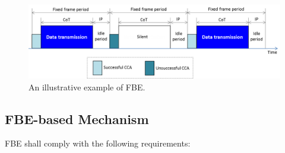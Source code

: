 \begin{figure}[!t]
	\centering
	\includegraphics[width=0.9\columnwidth]{figs/FBE-example}
	\caption{An illustrative example of FBE.}
	\label{figs:FBE-example}
\end{figure}


\subsection{FBE-based Mechanism}
\label{etsi-lbt:fbe}

FBE shall comply with the following requirements:

